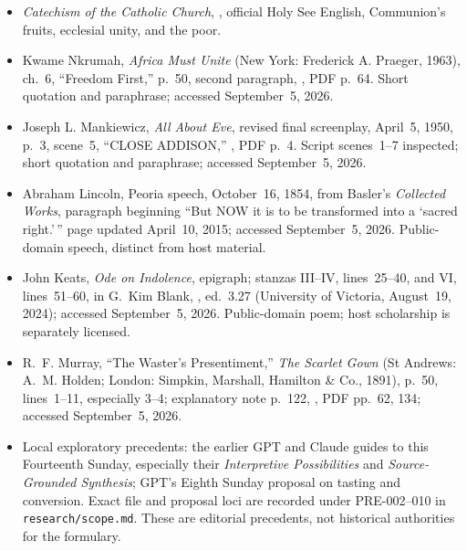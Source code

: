 {\begin{itemize}[leftmargin=1.1em,labelsep=0.35em,itemsep=0.22em,topsep=0.15em,parsep=0pt]
\item \emph{Catechism of the Catholic Church},
,
official Holy See English, Communion's fruits, ecclesial unity, and the poor.

\item Kwame Nkrumah, \emph{Africa Must Unite} (New York: Frederick A.
Praeger, 1963), ch.~6, ``Freedom First,'' p.~50, second paragraph,
,
PDF p.~64. Short quotation and paraphrase; accessed September~5, 2026.

\item Joseph L. Mankiewicz, \emph{All About Eve}, revised final screenplay,
April~5, 1950, p.~3, scene~5, ``CLOSE ADDISON,''
,
PDF p.~4. Script scenes~1--7 inspected; short quotation and paraphrase;
accessed September~5, 2026.

\item Abraham Lincoln, Peoria speech, October~16, 1854,
from Basler's \emph{Collected Works}, paragraph beginning ``But NOW it is to
be transformed into a `sacred right.'\,'' page updated April~10, 2015;
accessed September~5, 2026. Public-domain speech, distinct from host material.

\item John Keats, \emph{Ode on Indolence}, epigraph; stanzas III--IV,
lines~25--40, and VI, lines~51--60, in G.~Kim Blank,
,
ed.~3.27 (University of Victoria, August~19, 2024); accessed September~5,
2026. Public-domain poem; host scholarship is separately licensed.

\item R.~F. Murray, ``The Waster's Presentiment,'' \emph{The Scarlet Gown}
(St Andrews: A.~M. Holden; London: Simpkin, Marshall, Hamilton \& Co., 1891), p.~50,
lines~1--11, especially 3--4; explanatory note p.~122,
,
PDF pp.~62, 134; accessed September~5, 2026.

\item Local exploratory precedents: the earlier GPT and Claude guides to
this Fourteenth Sunday, especially their \emph{Interpretive Possibilities}
and \emph{Source-Grounded Synthesis}; GPT's Eighth Sunday proposal on tasting
and conversion. Exact file and proposal loci are recorded under PRE-002--010
in \nolinkurl{research/scope.md}. These are editorial precedents, not
historical authorities for the formulary.
\end{itemize}
}
